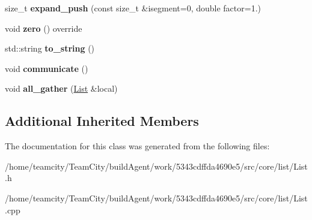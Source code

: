 \begin{DoxyCompactItemize}
\item 
size\+\_\+t {\bfseries expand\+\_\+push} (const size\+\_\+t \&isegment=0, double factor=1.)\hypertarget{classList_a00b36d166fef357fbfdf97db1dcc27d6}{}\label{classList_a00b36d166fef357fbfdf97db1dcc27d6}

\item 
void {\bfseries zero} () override\hypertarget{classList_aabaae7c14a6dfea6ae960372318d056a}{}\label{classList_aabaae7c14a6dfea6ae960372318d056a}

\item 
std\+::string {\bfseries to\+\_\+string} ()\hypertarget{classList_a342d5bda97e6150e07f3d403946cf452}{}\label{classList_a342d5bda97e6150e07f3d403946cf452}

\item 
void {\bfseries communicate} ()\hypertarget{classList_abd69e9175663739fd25ddca946e316b8}{}\label{classList_abd69e9175663739fd25ddca946e316b8}

\item 
void {\bfseries all\+\_\+gather} (\hyperlink{classList}{List} \&local)\hypertarget{classList_a907fcdc7cdd8446d3dd8763508e8a1e9}{}\label{classList_a907fcdc7cdd8446d3dd8763508e8a1e9}

\end{DoxyCompactItemize}
\subsection*{Additional Inherited Members}


The documentation for this class was generated from the following files\+:\begin{DoxyCompactItemize}
\item 
/home/teamcity/\+Team\+City/build\+Agent/work/5343cdffda4690e5/src/core/list/List.\+h\item 
/home/teamcity/\+Team\+City/build\+Agent/work/5343cdffda4690e5/src/core/list/List.\+cpp\end{DoxyCompactItemize}
